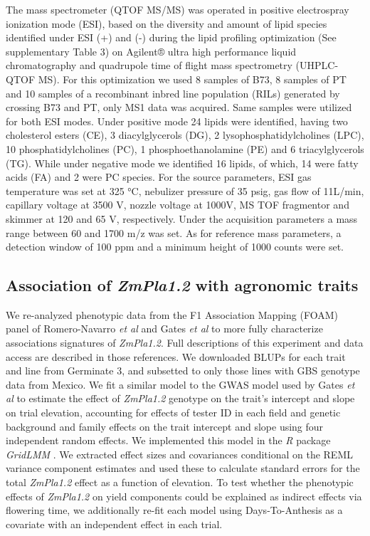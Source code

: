 \documentclass[9pt,twocolumn,twoside,lineno]{gsajnl}
\begin{document}
The mass spectrometer (QTOF MS/MS) was operated in positive electrospray ionization mode (ESI), based on the diversity and amount of lipid species identified under ESI (+) and (-) during the lipid profiling optimization (See supplementary Table 3) on Agilent® ultra high performance liquid chromatography and quadrupole time of flight mass spectrometry (UHPLC-QTOF MS). For this optimization we used 8 samples of B73, 8 samples of PT and 10 samples of a recombinant inbred line population (RILs) generated by crossing B73 and PT, only MS1 data was acquired. Same samples were utilized for both ESI modes. 
Under positive mode 24 lipids were identified, having two cholesterol esters (CE), 3 diacylglycerols (DG), 2 lysophosphatidylcholines (LPC), 10 phosphatidylcholines (PC), 1 phosphoethanolamine (PE) and 6 triacylglycerols (TG). 
While under negative mode we identified 16 lipids, of which, 14 were fatty acids (FA) and 2 were PC species. 
For the source parameters, ESI gas temperature was set at 325 °C, nebulizer pressure of 35 psig, gas flow of 11L/min, capillary voltage at 3500 V, nozzle voltage at 1000V, MS TOF fragmentor and skimmer at 120 and 65 V, respectively. 
Under the acquisition parameters a mass range between 60 and 1700 m/z was set. As for reference mass parameters, a detection window of 100 ppm and a minimum height of 1000 counts were set. 

\subsection*{Association of \textit{ZmPla1.2} with agronomic traits}
We re-analyzed phenotypic data from the F1 Association Mapping (FOAM) panel of Romero-Navarro \textit{et al} \cite{Romero_Navarro2017-cn} and Gates \textit{et al} \cite{Gates2019-xu} to more fully characterize associations signatures of \textit{ZmPla1.2}. 
Full descriptions of this experiment and data access are described in those references. 
We downloaded BLUPs for each trait and line from Germinate 3, and subsetted to only those lines with GBS genotype data from Mexico. 
We fit a similar model to the GWAS model used by Gates \textit{et al} \cite{Gates2019-xu} to estimate the effect of \textit{ZmPla1.2} genotype on the trait's intercept and slope on trial elevation, accounting for effects of tester ID in each field and genetic background and family effects on the trait intercept and slope using four independent random effects. 
We implemented this model in the \textit{R} package \textit{GridLMM} \cite{GridLMM2019}. 
We extracted effect sizes and covariances conditional on the REML variance component estimates and used these to calculate standard errors for the total \textit{ZmPla1.2} effect as a function of elevation. 
To test whether the phenotypic effects of \textit{ZmPla1.2} on yield components could be explained as indirect effects via flowering time, we additionally re-fit each model using Days-To-Anthesis as a covariate with an independent effect in each trial.
\end{document}
